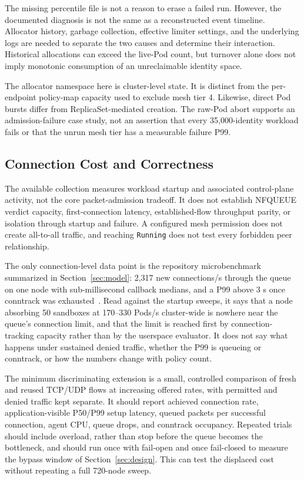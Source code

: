 \documentclass[letterpaper,twocolumn,10pt]{article}
\begin{document}
The missing percentile file is not a reason to erase a failed run.
However, the documented diagnosis is not the same as a reconstructed
event timeline. Allocator history, garbage collection, effective limiter
settings, and the underlying logs are needed to separate the two causes
and determine their interaction. Historical allocations can exceed the
live-Pod count, but turnover alone does not imply monotonic consumption
of an unreclaimable identity space.

The allocator namespace here is cluster-level state. It is distinct
from the per-endpoint policy-map capacity used to exclude mesh tier 4.
Likewise, direct Pod bursts differ from ReplicaSet-mediated creation.
The raw-Pod abort supports an admission-failure case study, not an
assertion that every 35,000-identity workload fails or that the unrun
mesh tier has a measurable failure P99.

\subsection{Connection Cost and Correctness}
The available collection measures workload startup and associated
control-plane activity, not the core packet-admission tradeoff. It does
not establish NFQUEUE verdict capacity, first-connection latency,
established-flow throughput parity, or isolation through startup and
failure. A configured mesh permission does not create all-to-all
traffic, and reaching \texttt{Running} does not test every forbidden
peer relationship.

The only connection-level data point is the repository microbenchmark
summarized in Section~\ref{sec:model}: 2,317 new connections/s through
the queue on one node with sub-millisecond callback medians, and a P99
above 3 s once conntrack was exhausted~\cite{knptesting}. Read against
the startup sweeps, it says that a node absorbing 50 sandboxes at
170--330 Pods/s cluster-wide is nowhere near the queue's connection
limit, and that the limit is reached first by connection-tracking
capacity rather than by the userspace evaluator. It does not say what
happens under sustained denied traffic, whether the P99 is queueing or
conntrack, or how the numbers change with policy count.

The minimum discriminating extension is a small, controlled comparison
of fresh and reused TCP/UDP flows at increasing offered rates, with
permitted and denied traffic kept separate. It should report achieved
connection rate, application-visible P50/P99 setup latency, queued
packets per successful connection, agent CPU, queue drops, and conntrack
occupancy. Repeated trials should include overload, rather than stop
before the queue becomes the bottleneck, and should run once with
fail-open and once fail-closed to measure the bypass window of
Section~\ref{sec:design}. This can test the displaced cost without
repeating a full 720-node sweep.
\end{document}
